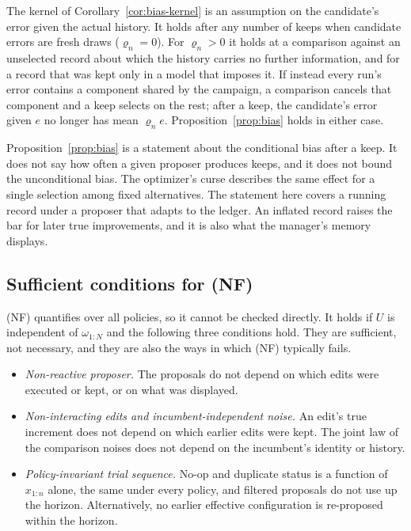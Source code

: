 The kernel of Corollary~\ref{cor:bias-kernel} is an assumption on the candidate's error given the actual history. It holds after any number of keeps when candidate errors are fresh draws ($\varrho_n=0$). For $\varrho_n>0$ it holds at a comparison against an unselected record about which the history carries no further information, and for a record that was kept only in a model that imposes it. If instead every run's error contains a component shared by the campaign, a comparison cancels that component and a keep selects on the rest; after a keep, the candidate's error given $e$ no longer has mean $\varrho_n e$. Proposition~\ref{prop:bias} holds in either case.

Proposition~\ref{prop:bias} is a statement about the conditional bias after a keep. It does not say how often a given proposer produces keeps, and it does not bound the unconditional bias. The optimizer's curse \citep{smith2006optimizer,andrews2024winners} describes the same effect for a single selection among fixed alternatives. The statement here covers a running record under a proposer that adapts to the ledger. An inflated record raises the bar for later true improvements, and it is also what the manager's memory displays.

\subsection{Sufficient conditions for (NF)}

(NF) quantifies over all policies, so it cannot be checked directly. It holds if $U$ is independent of $\omega_{1:N}$ and the following three conditions hold. They are sufficient, not necessary, and they are also the ways in which (NF) typically fails.
\begin{itemize}
\item \emph{Non-reactive proposer.} The proposals do not depend on which edits were executed or kept, or on what was displayed.
\item \emph{Non-interacting edits and incumbent-independent noise.} An edit's true increment does not depend on which earlier edits were kept. The joint law of the comparison noises does not depend on the incumbent's identity or history.
\item \emph{Policy-invariant trial sequence.} No-op and duplicate status is a function of $x_{1:n}$ alone, the same under every policy, and filtered proposals do not use up the horizon. Alternatively, no earlier effective configuration is re-proposed within the horizon.
\end{itemize}

